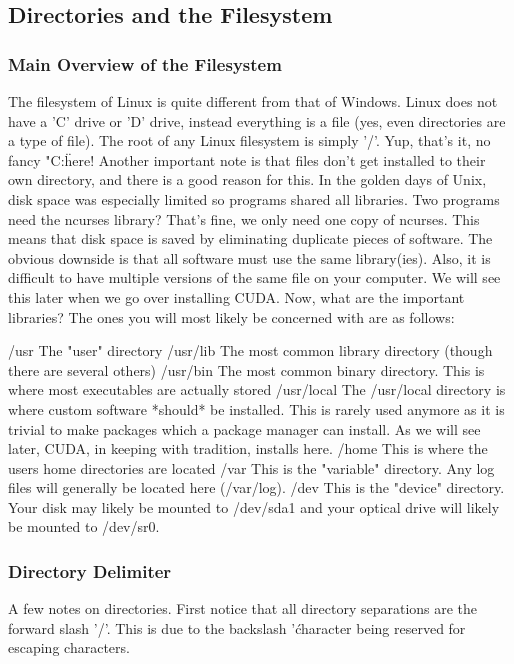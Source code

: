 	
\subsection{Directories and the Filesystem} \mdseries 
\subsubsection{Main Overview of the Filesystem} \mdseries 
The filesystem of Linux is quite different from that of Windows.  Linux does not have a 'C' drive or 'D' drive, instead everything is a file (yes, even directories are a type of file).  The root of any Linux filesystem is simply '/'.  Yup, that's it, no fancy "C:\" here!  Another important note is that files don't get installed to their own directory, and there is a good reason for this.  In the golden days of Unix, disk space was especially limited so programs shared all libraries.  Two programs need the ncurses library? That's fine, we only need one copy of ncurses.  This means that disk space is saved by eliminating duplicate pieces of software.  The obvious downside is that all software must use the same library(ies).  Also, it is difficult to have multiple versions of the same file on your computer.  We will see this later when we go over installing CUDA.  Now, what are the important libraries?  The ones you will most likely be concerned with are as follows:

	/usr		The "user" directory
	/usr/lib	The most common library directory (though there are several others)
	/usr/bin	The most common binary directory.  This is where most executables are actually stored
	/usr/local	The /usr/local directory is where custom software *should* be installed.  
				This is rarely used anymore as it is trivial to make packages which a package manager can install.  
				As we will see later, CUDA, in keeping with tradition, installs here.
	/home		This is where the users home directories are located
	/var		This is the "variable" directory.  Any log files will generally be located here (/var/log).
	/dev		This is the "device" directory.  Your disk may likely be mounted to /dev/sda1 and your optical drive will likely be mounted to /dev/sr0.

\subsubsection{Directory Delimiter} \mdseries
A few notes on directories.  First notice that all directory separations are the forward slash '/'.  This is due to the backslash '\' character being reserved for escaping characters.  

